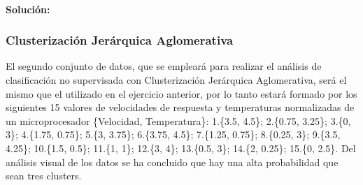 \documentclass[a4paper, 12pt]{article}
\begin{document}
	\paragraph{Solución:}
	
	
	\subsubsection{Clusterización Jerárquica Aglomerativa}
	
	El segundo conjunto de datos, que se empleará para realizar el análisis de clasificación no supervisada con Clusterización Jerárquica Aglomerativa, será el mismo que el utilizado en el ejercicio anterior, por lo tanto estará formado por los siguientes 15 valores de velocidades de respuesta y temperaturas normalizadas de un microprocesador \{Velocidad, Temperatura\}: 1.\{3.5, 4.5\}; 2.\{0.75, 3.25\}; 3.\{0, 3\}; 4.\{1.75, 0.75\}; 5.\{3, 3.75\}; 6.\{3.75, 4.5\}; 7.\{1.25, 0.75\}; 8.\{0.25, 3\}; 9.\{3.5, 4.25\}; 10.\{1.5, 0.5\}; 11.\{1, 1\}; 12.\{3, 4\}; 13.\{0.5, 3\}; 14.\{2, 0.25\}; 15.\{0, 2.5\}. Del análisis visual de los datos se ha concluido que hay una alta probabilidad que sean tres clusters.
	
\end{document}
